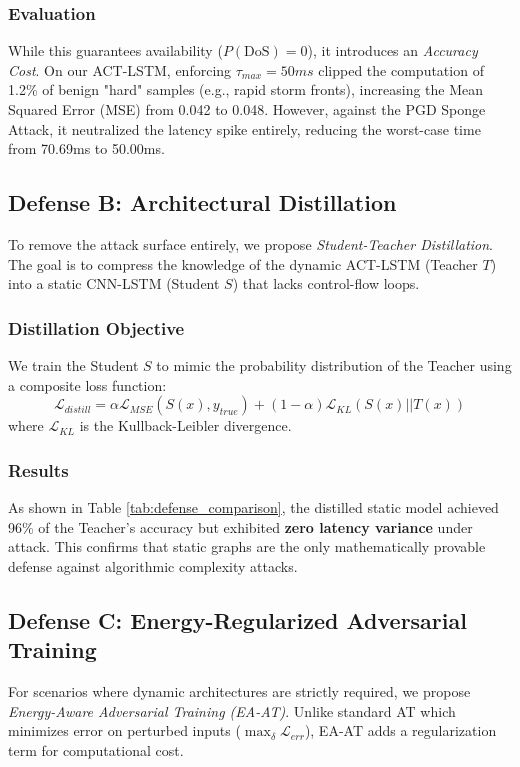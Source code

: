 \documentclass[conference]{IEEEtran}
\begin{document}
\subsubsection{Evaluation}
While this guarantees availability ($P(\text{DoS}) = 0$), it introduces an \textit{Accuracy Cost}. On our ACT-LSTM, enforcing $\tau_{max}=50ms$ clipped the computation of 1.2\% of benign "hard" samples (e.g., rapid storm fronts), increasing the Mean Squared Error (MSE) from 0.042 to 0.048. However, against the PGD Sponge Attack, it neutralized the latency spike entirely, reducing the worst-case time from 70.69ms to 50.00ms.

\subsection{Defense B: Architectural Distillation}
To remove the attack surface entirely, we propose \textit{Student-Teacher Distillation}. The goal is to compress the knowledge of the dynamic ACT-LSTM (Teacher $T$) into a static CNN-LSTM (Student $S$) that lacks control-flow loops.

\subsubsection{Distillation Objective}
We train the Student $S$ to mimic the probability distribution of the Teacher using a composite loss function:
\begin{equation}
    \mathcal{L}_{distill} = \alpha \mathcal{L}_{MSE}(S(x), y_{true}) + (1-\alpha) \mathcal{L}_{KL}(S(x) || T(x))
\end{equation}
where $\mathcal{L}_{KL}$ is the Kullback-Leibler divergence. 

\subsubsection{Results}
As shown in Table \ref{tab:defense_comparison}, the distilled static model achieved 96\% of the Teacher's accuracy but exhibited \textbf{zero latency variance} under attack. This confirms that static graphs are the only mathematically provable defense against algorithmic complexity attacks.

\subsection{Defense C: Energy-Regularized Adversarial Training}
For scenarios where dynamic architectures are strictly required, we propose \textit{Energy-Aware Adversarial Training (EA-AT)}. Unlike standard AT which minimizes error on perturbed inputs ($\max_\delta \mathcal{L}_{err}$), EA-AT adds a regularization term for computational cost.
\end{document}
